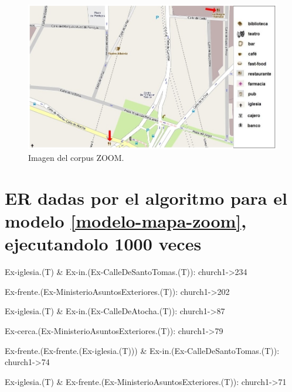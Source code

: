 \begin{figure}
\centering
\includegraphics[width=\textwidth]{images/corpus/mapa19.png}
\caption{Imagen del corpus ZOOM.}
\label{mapa19}
\end{figure}

\chapter{ER dadas por el algoritmo para el modelo \ref{modelo-mapa-zoom}, ejecutandolo 1000 veces}
\label{er-mapa-zoom}


Ex-iglesia.(T) \& Ex-in.(Ex-CalleDeSantoTomas.(T)): church1->234

Ex-frente.(Ex-MinisterioAsuntosExteriores.(T)): church1->202

Ex-iglesia.(T) \& Ex-in.(Ex-CalleDeAtocha.(T)): church1->87

Ex-cerca.(Ex-MinisterioAsuntosExteriores.(T)): church1->79

Ex-frente.(Ex-frente.(Ex-iglesia.(T))) \& Ex-in.(Ex-CalleDeSantoTomas.(T)): church1->74

Ex-iglesia.(T) \& Ex-frente.(Ex-MinisterioAsuntosExteriores.(T)): church1->71

